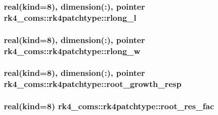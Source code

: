 \subsubsection[{\texorpdfstring{rlong\+\_\+l}{rlong_l}}]{\setlength{\rightskip}{0pt plus 5cm}real(kind=8), dimension(\+:), pointer rk4\+\_\+coms\+::rk4patchtype\+::rlong\+\_\+l}\hypertarget{structrk4__coms_1_1rk4patchtype_a9efd30ff1eef677965f421c035ad8354}{}\label{structrk4__coms_1_1rk4patchtype_a9efd30ff1eef677965f421c035ad8354}
\subsubsection[{\texorpdfstring{rlong\+\_\+w}{rlong_w}}]{\setlength{\rightskip}{0pt plus 5cm}real(kind=8), dimension(\+:), pointer rk4\+\_\+coms\+::rk4patchtype\+::rlong\+\_\+w}\hypertarget{structrk4__coms_1_1rk4patchtype_ad07c1f3137aeb62f18b2f11d1fd1072a}{}\label{structrk4__coms_1_1rk4patchtype_ad07c1f3137aeb62f18b2f11d1fd1072a}
\subsubsection[{\texorpdfstring{root\+\_\+growth\+\_\+resp}{root_growth_resp}}]{\setlength{\rightskip}{0pt plus 5cm}real(kind=8), dimension(\+:), pointer rk4\+\_\+coms\+::rk4patchtype\+::root\+\_\+growth\+\_\+resp}\hypertarget{structrk4__coms_1_1rk4patchtype_a9312ce306daa7cdeed197c4fdfea3c85}{}\label{structrk4__coms_1_1rk4patchtype_a9312ce306daa7cdeed197c4fdfea3c85}
\subsubsection[{\texorpdfstring{root\+\_\+res\+\_\+fac}{root_res_fac}}]{\setlength{\rightskip}{0pt plus 5cm}real(kind=8) rk4\+\_\+coms\+::rk4patchtype\+::root\+\_\+res\+\_\+fac}\hypertarget{structrk4__coms_1_1rk4patchtype_ac5ef1027d0c6d201ebfa3d7730a1d5f8}{}\label{structrk4__coms_1_1rk4patchtype_ac5ef1027d0c6d201ebfa3d7730a1d5f8}

